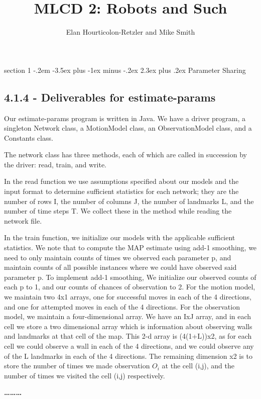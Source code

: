 \documentclass[12pt]{article}
\makeatletter
\newenvironment{problem}{\@startsection
       {section}
       {1}
       {-.2em}
       {-3.5ex plus -1ex minus -.2ex}
       {2.3ex plus .2ex}
       {\pagebreak[3]%
       \large\bf\noindent{Problem }
       }
       }
       {%
       \begin{center}\large\bf \ldots\ldots\ldots\end{center}}
\makeatother
\begin{document}
\title{MLCD 2: Robots and Such }
\author{Elan Hourticolon-Retzler and Mike Smith}

\maketitle

\thispagestyle{empty}

\begin{problem}{Parameter Sharing}


\subsection*{4.1.4 - Deliverables for estimate-params}

Our estimate-params program is written in Java.  We have a driver 
program, a singleton Network class, a MotionModel class, an 
ObservationModel class, and a Constants class.

The network class has three methods, each of which are called in 
succession by the driver: read, train, and write.

In the read function we use assumptions specified about our models and 
the input format to determine sufficient statistics for each network; 
they are the number of rows I, the number of columns J, the number of 
landmarks L, and the number of time steps T.  We collect these in the 
method while reading the network file.

In the train function, we initialize our models with the applicable 
sufficient statistics.  We note that to compute the MAP estimate using
add-1 smoothing, we need to only maintain counts of times we observed 
each parameter p, and maintain counts of all possible instances where 
we could have observed said parameter p.  To implement add-1 smoothing, 
We initialize our observed counts of each p to 1, and our counts of 
chances of observation to 2.
For the motion model, we maintain two 4x1 arrays, one for successful 
moves in each of the 4 directions, and one for attempted moves in each 
of the 4 directions.
For the observation model, we maintain a four-dimensional array.  We 
have an IxJ array, and in each cell we store a two dimensional array 
which is information about observing walls and landmarks at that cell 
of the map.  This 2-d array is (4(1+L))x2, as for each cell we could 
observe a wall in each of the 4 directions, and we could observe any of
 the L landmarks in each of the 4 directions.  The remaining dimension 
x2 is to store the number of times we made observation $O_i$ at the cell 
(i,j), and the number of times we visited the cell (i,j) respectively.


\end{problem}
\end{document}
